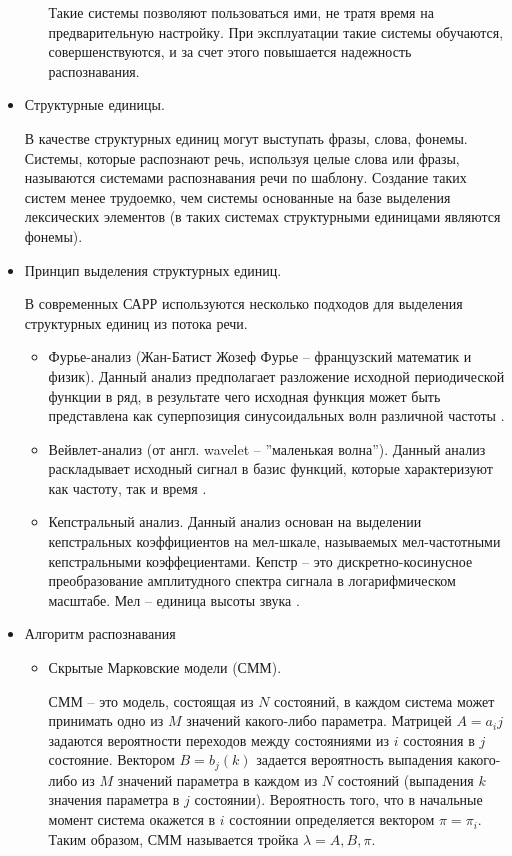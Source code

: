 \begin{itemize}
\begin{itemize}
		Такие системы позволяют пользоваться ими, не тратя время на предварительную настройку. При эксплуатации такие системы обучаются, совершенствуются, и за счет этого повышается надежность распознавания.
		
	\end{itemize}
	\item Структурные единицы. 
	
	В качестве структурных единиц могут выступать фразы, слова, фонемы. Системы, которые распознают речь, используя целые слова или фразы, называются системами распознавания речи по шаблону. Создание таких систем менее трудоемко, чем системы основанные на базе выделения лексических элементов (в таких системах структурными единицами являются фонемы). 
	
	\item Принцип выделения структурных единиц.
	
	В современных САРР используются несколько подходов для выделения структурных единиц из потока речи. 
	\begin{itemize}
		\item Фурье-анализ (Жан-Батист Жозеф Фурье -- французский математик и физик). Данный анализ предполагает разложение исходной периодической функции в ряд, в результате чего исходная функция может быть представлена как суперпозиция синусоидальных волн различной частоты \cite{fur_veivlet}.
		\item Вейвлет-анализ (от англ. wavelet -- ''маленькая волна''). Данный анализ раскладывает исходный сигнал в базис функций, которые характеризуют как частоту, так и время \cite{fur_veivlet}.
		\item Кепстральный анализ. Данный анализ основан на выделении кепстральных коэффициентов на мел-шкале, называемых мел-частотными кепстральными коэффециентами. Кепстр -- это дискретно-косинусное преобразование амплитудного спектра сигнала в логарифмическом масштабе. Мел -- единица высоты звука \cite{kepstr}.
	\end{itemize}
	
	\item Алгоритм распознавания
	\begin{itemize}
		\item Скрытые Марковские модели (СММ).
		
		СММ -- это модель, состоящая из $N$ состояний, в каждом система может принимать одно из $M$ значений какого-либо параметра. Матрицей $A = {a_ij}$ задаются вероятности переходов между состояниями из $i$ состояния в $j$ состояние. Вектором $B = {b_j (k)}$ задается вероятность выпадения какого-либо из $M$ значений параметра в каждом из $N$ состояний (выпадения $k$ значения параметра в $j$ состоянии). Вероятность того, что в начальные момент система окажется в $i$ состоянии определяется вектором $\pi = {\pi_i}$. Таким образом, СММ называется тройка $\lambda = {A, B, \pi}$. 
		

\end{itemize}
\end{itemize}

